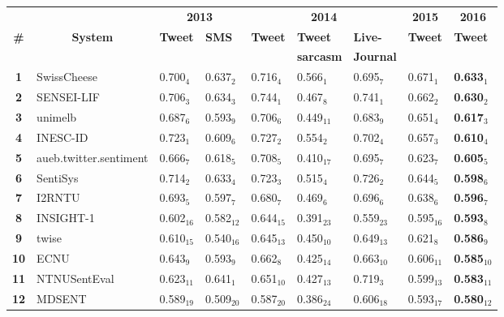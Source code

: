 \begin{table*}[tbh]
\centering
\begin{small}
\renewcommand{\arraystretch}{1.0}%
\begin{tabular}{|c|l|ll|lll|l|l|}
\hline
   & & \multicolumn{2}{c|}{\bf 2013} & \multicolumn{3}{c|}{\bf 2014} & \multicolumn{1}{c|}{\bf 2015} & \multicolumn{1}{c|}{\bf 2016} \\
   \bf \# & \multicolumn{1}{c|}{\bf System} & \bf Tweet & \bf SMS & \bf Tweet & \bf Tweet & \bf Live- & \bf Tweet & \bf Tweet \\
   & &  &  & \bf & \bf sarcasm & \bf Journal & & \bf \\
\hline
\bf 1 & SwissCheese & 0.700$_{4}$ & 0.637$_{2}$ & 0.716$_{4}$ & 0.566$_{1}$ & 0.695$_{7}$ & 0.671$_{1}$ & \bf 0.633$_{1}$ \\
\bf 2 & SENSEI-LIF & 0.706$_{3}$ & 0.634$_{3}$ & 0.744$_{1}$ & 0.467$_{8}$ & 0.741$_{1}$ & 0.662$_{2}$ & \bf 0.630$_{2}$ \\
\bf 3 & unimelb & 0.687$_{6}$ & 0.593$_{9}$ & 0.706$_{6}$ & 0.449$_{11}$ & 0.683$_{9}$ & 0.651$_{4}$ & \bf 0.617$_{3}$ \\
\bf 4 & INESC-ID & 0.723$_{1}$ & 0.609$_{6}$ & 0.727$_{2}$ & 0.554$_{2}$ & 0.702$_{4}$ & 0.657$_{3}$ & \bf 0.610$_{4}$ \\
\bf 5 & aueb.twitter.sentiment & 0.666$_{7}$ & 0.618$_{5}$ & 0.708$_{5}$ & 0.410$_{17}$ & 0.695$_{7}$ & 0.623$_{7}$ & \bf 0.605$_{5}$ \\
\bf 6 & SentiSys & 0.714$_{2}$ & 0.633$_{4}$ & 0.723$_{3}$ & 0.515$_{4}$ & 0.726$_{2}$ & 0.644$_{5}$ & \bf 0.598$_{6}$ \\
\bf 7 & I2RNTU & 0.693$_{5}$ & 0.597$_{7}$ & 0.680$_{7}$ & 0.469$_{6}$ & 0.696$_{6}$ & 0.638$_{6}$ & \bf 0.596$_{7}$ \\
\bf 8 & INSIGHT-1 & 0.602$_{16}$ & 0.582$_{12}$ & 0.644$_{15}$ & 0.391$_{23}$ & 0.559$_{23}$ & 0.595$_{16}$ & \bf 0.593$_{8}$ \\
\bf 9 & twise & 0.610$_{15}$ & 0.540$_{16}$ & 0.645$_{13}$ & 0.450$_{10}$ & 0.649$_{13}$ & 0.621$_{8}$ & \bf 0.586$_{9}$ \\
\bf 10 & ECNU & 0.643$_{9}$ & 0.593$_{9}$ & 0.662$_{8}$ & 0.425$_{14}$ & 0.663$_{10}$ & 0.606$_{11}$ & \bf 0.585$_{10}$ \\
\bf 11 & NTNUSentEval & 0.623$_{11}$ & 0.641$_{1}$ & 0.651$_{10}$ & 0.427$_{13}$ & 0.719$_{3}$ & 0.599$_{13}$ & \bf 0.583$_{11}$ \\
\bf 12 & MDSENT & 0.589$_{19}$ & 0.509$_{20}$ & 0.587$_{20}$ & 0.386$_{24}$ & 0.606$_{18}$ & 0.593$_{17}$ & \bf 0.580$_{12}$ \\

\end{tabular}
\end{small}
\end{table*}
